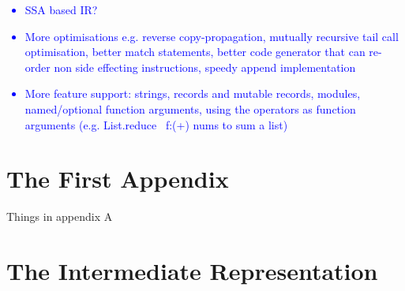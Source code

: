 \documentclass[12pt,twoside,notitlepage]{report}
\newcommand\note[1]{\textcolor{blue}{#1}}
\begin{document}
\note{
	\begin{itemize}
		\item SSA based IR?
		\item More optimisations e.g. reverse copy-propagation, mutually recursive tail call optimisation, better match statements, better code generator that can re-order non side effecting instructions, speedy append implementation
		\item More feature support: strings, records and mutable records, modules, named/optional function arguments, using the operators as function arguments (e.g. List.reduce ~f:(+) nums to sum a list)
	\end{itemize}
}





\clearpage


\printbibliography[title={Bibliography}]
\clearpage

\appendix

\chapter{The First Appendix}

Things in appendix A


\clearpage

\chapter{The Intermediate Representation}
\end{document}
